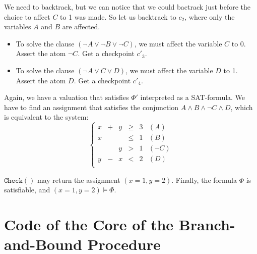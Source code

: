 \documentclass{article}
\newcommand{\icheck}{\mathtt{Check}()}
\begin{document}
We need to backtrack, but we can notice that we could bactrack just before
the choice to affect $C$ to 1 was made. So let us backtrack to $c_2$, where
only the variables $A$ and $B$ are affected.

\begin{itemize}
  \item To solve the clause $(\neg A \vee \neg B \vee \neg C)$, we must affect
    the variable $C$ to 0. Assert the atom $\neg C$. Get a checkpoint $c'_3$.
  \item To solve the clause $(\neg A \vee C \vee D)$, we must affect the
    variable $D$ to 1. Assert the atom $D$. Get a checkpoint $c'_4$.
\end{itemize}

Again, we have a valuation that satisfies $\Phi'$ interpreted as a
SAT-formula. We have to find an assignment that satisfies the conjunction
$A \wedge B \wedge \neg C \wedge D$, which is equivalent to the system:
\begin{displaymath}
  \left\{
  \begin{array}{cccccc}
    x  & + & y & \geqslant & 3 & (A) \\
    x  &   &   & \leqslant & 1 & (B) \\
       &   & y & >         & 1 & (\neg C) \\
    y  & - & x & <         & 2 & (D) \\
  \end{array}
  \right.
\end{displaymath}

$\icheck$ may return the assignment $(x=1, y=2)$. Finally, the formula $\Phi$
is satisfiable, and $(x=1, y=2) \vDash \Phi$.

\section{Code of the Core of the Branch-and-Bound Procedure}
\label{bbcode}
\end{document}
